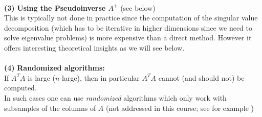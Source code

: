 \begin{frame}
	~\\
	\textbf{(3)} \textbf{Using the Pseudoinverse $A^+$} (see below)\\
	This is typically not done in practice since the computation of the singular value decomposition (which has to be iterative in higher dimensions since we need to solve eigenvalue problems) is more expensive than a direct method. However it offers interesting theoretical insights as we will see below.
	~\\~\\
	\textbf{(4)}\textbf{ Randomized algorithms:} \\
	If $A^TA$ is large ($n$ large), then in particular $A^TA$ cannot (and should not) be computed. \\
	In such cases one can use \textit{randomized} algorithms which only work with subsamples of the columns of $A$ (not addressed in this course; see for example \cite[II.4]{StrangData})\\ 
\end{frame}


